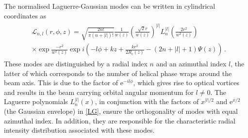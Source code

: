 \documentclass[../Thesis-IJspeert.tex]{subfiles}
\begin{document}
The normalised Laguerre-Gaussian modes can be written in cylindrical coordinates as
\begin{align}
\label{LG}
\begin{split}
&\mathcal{L}_{n,l}(r, \phi, z) = \sqrt{\frac{2n!}{\pi (n+\lvert l\rvert)!}}\frac{1}{w(z)} \left(\frac{\sqrt{2}r}{w(z)} \right)^{\!\vert l \rvert} L_n^{\lvert l \rvert} \left(\frac{2r^2}{w^2(z)}\right) \\ &\times\exp{\frac{-r^2}{w^2(z)}}\exp{ i\left(-l\phi + kz + \frac{kr^2}{2R_\mathrm{c}(z)} - (2n+\lvert l \rvert +1)\Psi(z)\right)} \,.
\end{split}
\end{align}
These modes are distinguished by a radial index $n$ and an azimuthal index $l$, the latter of which corresponds to the number of helical phase wraps around the beam axis. This is due to the factor of $\mathrm{e}^{ -il\phi}$, which gives rise to optical vortices and results in the beam carrying orbital angular momentum for $l\neq0$. The Laguerre polynomials $L_n^{\lvert l \rvert}(x)$, in conjunction with the factors of $x^{\vert l \rvert/2}$ and $\mathrm{e}^{x/2}$ (the Gaussian envelope) in \autoref{LG}, ensure the orthogonality of modes with equal azimuthal index. In addition, they are responsible for the characteristic radial intensity distribution associated with these modes.
\end{document}
